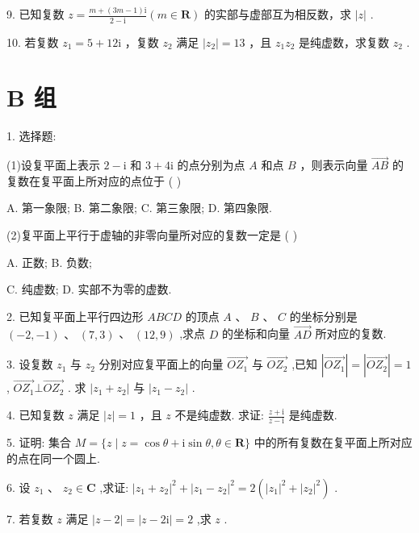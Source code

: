 \documentclass[10pt]{article}
\begin{document}
9. 已知复数 \(z = \frac{m + \left( {{3m} - 1}\right) \mathrm{i}}{2 - \mathrm{i}}\left( {m \in  \mathbf{R}}\right)\) 的实部与虚部互为相反数，求 \(\left| z\right|\) .

10. 若复数 \({z}_{1} = 5 + {12}\mathrm{i}\) ，复数 \({z}_{2}\) 满足 \(\left| {z}_{2}\right|  = {13}\) ，且 \({z}_{1}{z}_{2}\) 是纯虚数，求复数 \({z}_{2}\) .

\section*{B 组}

1. 选择题:

(1)设复平面上表示 \(2 - \mathrm{i}\) 和 \(3 + 4\mathrm{i}\) 的点分别为点 \(A\) 和点 \(B\) ，则表示向量 \(\overrightarrow{AB}\) 的复数在复平面上所对应的点位于 ( )

A. 第一象限; B. 第二象限; C. 第三象限; D. 第四象限.

(2)复平面上平行于虚轴的非零向量所对应的复数一定是 ( )

A. 正数; B. 负数;

C. 纯虚数; D. 实部不为零的虚数.

2. 已知复平面上平行四边形 \({ABCD}\) 的顶点 \(A\text{ 、 }B\text{ 、 }C\) 的坐标分别是 \(\left( {-2, - 1}\right) \text{ 、 }\left( {7,3}\right)\) 、 \(\left( {{12},9}\right)\) ,求点 \(D\) 的坐标和向量 \(\overrightarrow{AD}\) 所对应的复数.

3. 设复数 \({z}_{1}\) 与 \({z}_{2}\) 分别对应复平面上的向量 \(\overrightarrow{O{Z}_{1}}\) 与 \(\overrightarrow{O{Z}_{2}}\) ,已知 \(\left| \overrightarrow{O{Z}_{1}}\right|  = \left| \overrightarrow{O{Z}_{2}}\right|  = 1\) , \(\overrightarrow{O{Z}_{1}} \bot  \overrightarrow{O{Z}_{2}}\) . 求 \(\left| {{z}_{1} + {z}_{2}}\right|\) 与 \(\left| {{z}_{1} - {z}_{2}}\right|\) .

4. 已知复数 \(z\) 满足 \(\left| z\right|  = 1\) ，且 \(z\) 不是纯虚数. 求证: \(\frac{z + \mathrm{i}}{z - \mathrm{i}}\) 是纯虚数.

5. 证明: 集合 \(M = \{ z \mid  z = \cos \theta  + \mathrm{i}\sin \theta ,\theta  \in  \mathbf{R}\}\) 中的所有复数在复平面上所对应的点在同一个圆上.

6. 设 \({z}_{1}\text{ 、 }{z}_{2} \in  \mathbf{C}\) ,求证: \({\left| {z}_{1} + {z}_{2}\right| }^{2} + {\left| {z}_{1} - {z}_{2}\right| }^{2} = 2\left( {{\left| {z}_{1}\right| }^{2} + {\left| {z}_{2}\right| }^{2}}\right)\) .

7. 若复数 \(z\) 满足 \(\left| {z - 2}\right|  = \left| {z - 2\mathrm{i}}\right|  = 2\) ,求 \(z\) .
\end{document}
